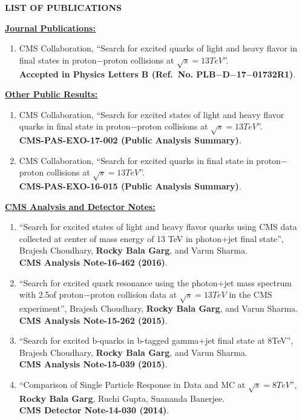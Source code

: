\begin{center}
\doublespacing
{\large \textbf{LIST OF PUBLICATIONS}}
\end{center}

\onehalfspacing
\vspace{0.5cm}
{\large \underline{\textbf{Journal Publications:}}}

\begin{enumerate}
\item CMS Collaboration, ``Search for excited quarks of light and heavy flavor in \gamjet final states in proton$-$proton collisions at $\sqrt{s} = 13\unit{TeV}$''. \\ {\bf Accepted in Physics Letters B (Ref.\ No.\: PLB$-$D$-$17$-$01732R1)}.
\end{enumerate}

\vspace{0.3cm}

{\large \underline{\textbf{Other Public Results:}}}

\begin{enumerate}
\item CMS Collaboration, ``Search for excited states of light and heavy flavor quarks in \gamjet final state in proton$-$proton collisions at $\sqrt{s} = 13\unit{TeV}$''. \\ {\bf CMS-PAS-EXO-17-002 (Public Analysis Summary)}.
\item CMS Collaboration, ``Search for excited quarks in \gamjet final state in proton$-$proton collisions at $\sqrt{s} = 13\unit{TeV}$''. \\ {\bf CMS-PAS-EXO-16-015 (Public Analysis Summary)}.
\end{enumerate}

\vspace{0.3cm}

{\large \underline{\textbf{CMS Analysis and Detector Notes:}}}
\begin{enumerate}
\item ``Search for excited states of light and heavy flavor quarks using CMS data collected at center of mass energy of 13 TeV in photon$+$jet final state'', Brajesh Choudhary, {\bf Rocky Bala Garg}, and Varun Sharma. \\ {\bf CMS Analysis Note-16-462 (2016)}.
\item ``Search for excited quark resonance using the photon$+$jet mass spectrum with 2.5\fbinv of proton$-$proton collision data at $\sqrt{s} = 13\unit{TeV}$ in the CMS experiment'', Brajesh Choudhary, {\bf Rocky Bala Garg}, and Varun Sharma. \\ {\bf CMS Analysis Note-15-262 (2015)}.
\item ``Search for excited b-quarks in b-tagged gamma$+$jet final state at 8\unit{TeV}'', Brajesh Choudhary, {\bf Rocky Bala Garg}, and Varun Sharma. \\ {\bf CMS Analysis Note-15-039 (2015)}.
\item ``Comparison of Single Particle Response in Data and MC at $\sqrt{s} = 8\unit{TeV}$'', {\bf Rocky Bala Garg}, Ruchi Gupta, Suananda Banerjee. \\ {\bf CMS Detector Note-14-030 (2014)}.
\end{enumerate}

